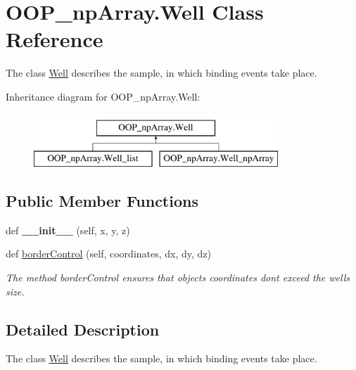 \hypertarget{class_o_o_p__np_array_1_1_well}{}\section{O\+O\+P\+\_\+np\+Array.\+Well Class Reference}
\label{class_o_o_p__np_array_1_1_well}


The class \mbox{\hyperlink{class_o_o_p__np_array_1_1_well}{Well}} describes the sample, in which binding events take place.  


Inheritance diagram for O\+O\+P\+\_\+np\+Array.\+Well\+:\begin{figure}[H]
\begin{center}
\leavevmode
\includegraphics[height=2.000000cm]{class_o_o_p__np_array_1_1_well}
\end{center}
\end{figure}
\subsection*{Public Member Functions}
\begin{DoxyCompactItemize}
\item 
\mbox{\label{class_o_o_p__np_array_1_1_well_ab7cb865616e6fd3e6e98604400329f0c}} 
def {\bfseries \+\_\+\+\_\+init\+\_\+\+\_\+} (self, x, y, z)
\item 
def \mbox{\hyperlink{class_o_o_p__np_array_1_1_well_a8991b9d19614962be6a088031f780554}{border\+Control}} (self, coordinates, dx, dy, dz)
\begin{DoxyCompactList}\small\item\em The method border\+Control ensures that objects\textquotesingle{} coordinates don\textquotesingle{}t exceed the well\textquotesingle{}s size. \end{DoxyCompactList}\end{DoxyCompactItemize}


\subsection{Detailed Description}
The class \mbox{\hyperlink{class_o_o_p__np_array_1_1_well}{Well}} describes the sample, in which binding events take place. 

